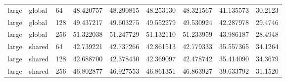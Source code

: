 \begin{longtable}{lllrrrrrr}
large & global & 64 & 48.420757 & 48.290815 & 48.253130 & 48.321567 & 41.135573 & 30.2123 \\
large & global & 128 & 49.437217 & 49.603275 & 49.552279 & 49.530924 & 42.287978 & 29.4746 \\
large & global & 256 & 51.322038 & 51.247729 & 51.132110 & 51.233959 & 43.986187 & 28.4948 \\
large & shared & 64 & 42.739221 & 42.737266 & 42.861513 & 42.779333 & 35.557365 & 34.1264 \\
large & shared & 128 & 42.688700 & 42.378430 & 42.369097 & 42.478742 & 35.414090 & 34.3679 \\
large & shared & 256 & 46.802877 & 46.927553 & 46.861351 & 46.863927 & 39.633792 & 31.1520 \\
\end{longtable}\normalsize
